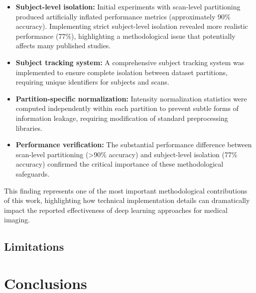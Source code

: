 \documentclass[12pt, a4paper]{article}
\begin{document}
\begin{itemize}
    \item \textbf{Subject-level isolation:} Initial experiments with scan-level partitioning produced artificially inflated performance metrics (approximately 90\% accuracy). Implementing strict subject-level isolation revealed more realistic performance (77\%), highlighting a methodological issue that potentially affects many published studies.
    
    \item \textbf{Subject tracking system:} A comprehensive subject tracking system was implemented to ensure complete isolation between dataset partitions, requiring unique identifiers for subjects and scans.
    
    \item \textbf{Partition-specific normalization:} Intensity normalization statistics were computed independently within each partition to prevent subtle forms of information leakage, requiring modification of standard preprocessing libraries.
    
    \item \textbf{Performance verification:} The substantial performance difference between scan-level partitioning (>90\% accuracy) and subject-level isolation (77\% accuracy) confirmed the critical importance of these methodological safeguards.
\end{itemize}

This finding represents one of the most important methodological contributions of this work, highlighting how technical implementation details can dramatically impact the reported effectiveness of deep learning approaches for medical imaging.

\subsection{Limitations}

\section{Conclusions}

\end{document}
